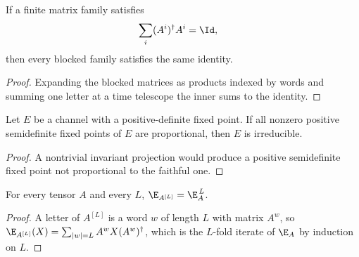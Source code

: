 \begin{lemma}
    \label{thm:left_canonical_blocking}
    \leanok
    If a finite matrix family satisfies
    \begin{align}
        \sum_i (A^i)^\dagger A^i & =\Id,
        \notag
    \end{align}
    then every blocked family satisfies the same identity.
\end{lemma}

\begin{proof}\leanok
    Expanding the blocked matrices as products indexed by words and summing one
    letter at a time telescope the inner sums to the identity.
\end{proof}

\begin{lemma}
    \label{thm:channel_posdef_fixed_point_unique_irreducible}
    \leanok

    Let $E$ be a channel with a positive-definite fixed point. If all nonzero
    positive semidefinite fixed points of $E$ are proportional, then $E$ is
    irreducible.
\end{lemma}

\begin{proof}\leanok
    A nontrivial invariant projection would produce a positive semidefinite
    fixed point not proportional to the faithful one.
\end{proof}

\begin{lemma}
    \label{thm:blocked_transfer_map}
    \leanok
    For every tensor $A$ and every $L$, $\E_{A^{[L]}}=\E_A^{\,L}$.
\end{lemma}

\begin{proof}
    \leanok
    A letter of $A^{[L]}$ is a word $w$ of length $L$ with matrix $A^w$, so
    $\E_{A^{[L]}}(X)=\sum_{\lvert w\rvert=L}A^wX(A^w)^\dagger$, which is the
    $L$-fold iterate of $\E_A$ by induction on $L$.
\end{proof}

